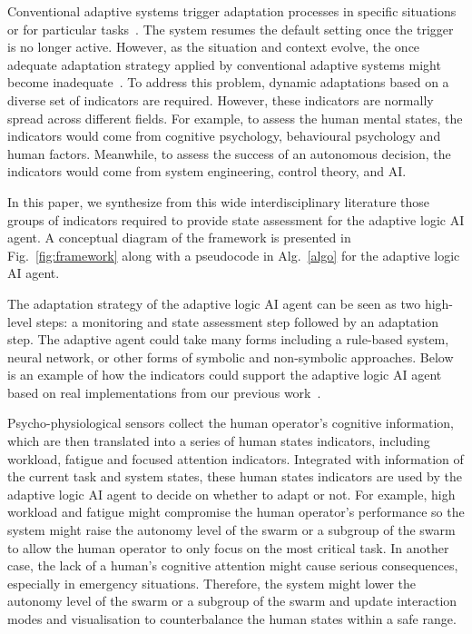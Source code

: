 \documentclass[journal]{IEEEtran}
\begin{document}
Conventional adaptive systems trigger adaptation processes in specific situations or for particular tasks~\cite{triggers}. The system resumes the default setting once the trigger is no longer active. However, as the situation and context evolve, the once adequate adaptation strategy applied by conventional adaptive systems might become inadequate~\cite{fuchs2017towards}. To address this problem, dynamic adaptations based on a diverse set of indicators are required. However, these indicators are normally spread across different fields. For example, to assess the human mental states, the indicators would come from cognitive psychology, behavioural psychology and human factors. Meanwhile, to assess the success of an autonomous decision, the indicators would come from system engineering, control theory, and AI.

In this paper, we synthesize from this wide interdisciplinary literature those groups of indicators required to provide state assessment for the adaptive logic AI agent. A conceptual diagram of the framework is presented in Fig.~\ref{fig:framework} along with a pseudocode in Alg.~\ref{algo} for the adaptive logic AI agent. 

The adaptation strategy of the adaptive logic AI agent can be seen as two high-level steps: a monitoring and state assessment step followed by an adaptation step. The adaptive agent could take many forms including a rule-based system, neural network, or other forms of symbolic and non-symbolic approaches. Below is an example of how the indicators could support the adaptive logic AI agent based on real implementations from our previous work~\cite{AdaptiveHA,harvey2018assessing,abbass2014computational}.

Psycho-physiological sensors collect the human operator's cognitive information, which are then translated into a series of human states indicators, including workload, fatigue and focused attention indicators. Integrated with information of the current task and system states, these human states indicators are used by the adaptive logic AI agent to decide on whether to adapt or not. For example, high workload and fatigue might compromise the human operator's performance so the system might raise the autonomy level of the swarm or a subgroup of the swarm to allow the human operator to only focus on the most critical task. In another case, the lack of a human\textquoteright s cognitive attention might cause serious consequences, especially in emergency situations. Therefore, the system might lower the autonomy level of the swarm or a subgroup of the swarm and update interaction modes and visualisation to counterbalance the human states within a safe range. 
\end{document}
